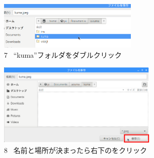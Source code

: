 \documentclass[a4paper,12pt]{jarticle}
\begin{document}
\begin{figure}[t]
  \begin{minipage}{\textwidth}
    \begin{minipage}{6.582cm}
      \includegraphics[width=6.671cm]{textbook-img100.png}\\
      7 \ “kuma”フォルダをダブルクリック
    \end{minipage}
    \begin{minipage}{2.582cm}
    \end{minipage}
    \begin{minipage}{6.582cm}
      \includegraphics[width=7.668cm]{textbook-img099.png}\\
      8 \ 名前と場所が決まったら右下のをクリック
    \end{minipage}
  \end{minipage}


  \bigskip



\end{figure}
\end{document}
